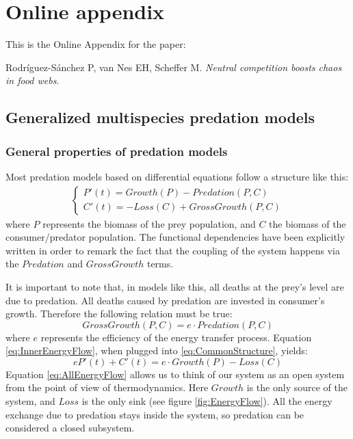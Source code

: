 \appendix
\setcounter{equation}{0}
\setcounter{figure}{0}
\renewcommand{\theequation}{A.\arabic{equation}}
\renewcommand\thefigure{A.\arabic{figure}}

\section{Online appendix}
\label{sec:Appendix}

This is the Online Appendix for the paper:

\begin{center}
Rodríguez-Sánchez P, van Nes EH, Scheffer M. \textit{Neutral competition boosts chaos in food webs}.
\end{center}

\subsection{Generalized multispecies predation models}
\label{subsec:GeneralizedModels}

\subsubsection{General properties of predation models}
\label{subsubsec:GeneralPropertiesOfPredation}

Most predation models based on differential equations follow a structure like this:
%
\begin{eqnarray}
\label{eq:CommonStructure}
	\begin{cases}
	P'(t) = Growth(P) - Predation(P,C)
	\\
	C'(t) = -Loss(C) + GrossGrowth(P,C)
	\end{cases}
\end{eqnarray}
%
where $P$ represents the biomass of the prey population, and $C$ the biomass of the consumer/predator population. The functional dependencies have been explicitly written in order to remark the fact that the coupling of the system happens via the $Predation$ and $GrossGrowth$ terms.

It is important to note that, in models like this, all deaths at the prey's level are due to predation. All deaths caused by predation are invested in consumer's growth. Therefore the following relation must be true:
%
\begin{equation}
\label{eq:InnerEnergyFlow}
	GrossGrowth(P,C) = e \cdot Predation(P,C)
\end{equation}
%
where $e$ represents the efficiency of the energy transfer process. Equation \eqref{eq:InnerEnergyFlow}, when plugged into \eqref{eq:CommonStructure}, yields:
%
\begin{equation}
\label{eq:AllEnergyFlow}
	e P'(t) + C'(t) = e \cdot Growth(P) - Loss(C)
\end{equation}
%
Equation \eqref{eq:AllEnergyFlow} allows us to think of our system as an open system from the point of view of thermodynamics. Here $Growth$ is the only source of the system, and $Loss$ is the only sink (see figure \ref{fig:EnergyFlow}). All the energy exchange due to predation stays inside the system, so predation can be considered a closed subsystem.

